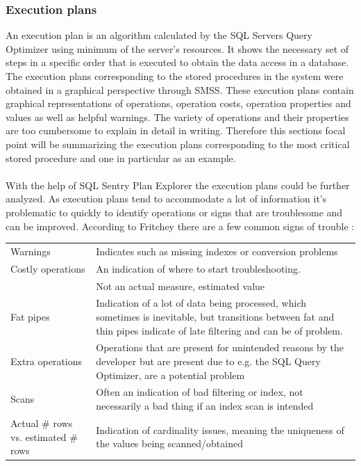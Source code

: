 \documentclass{cslthse-msc}
\begin{document}
\subsubsection{Execution plans}
An execution plan is an algorithm calculated by the SQL Servers Query Optimizer using minimum of the server's resources. It shows the necessary set of steps in a specific order that is executed to obtain the data access in a database. The execution plans corresponding to the stored procedures in the system were obtained in a graphical perspective through SMSS. These execution plans contain graphical representations of operations, operation costs, operation properties and values as well as helpful warnings. The variety of operations and their properties are too cumbersome to explain in detail in writing. Therefore this sections focal point will be summarizing the execution plans corresponding to the most critical stored procedure and one in particular as an example.\\\\      
With the help of SQL Sentry Plan Explorer the execution plans could be further analyzed. As execution plans tend to accommodate a lot of information it's problematic to quickly to identify operations or signs that are troublesome and can be improved. According to Fritchey there are a few common signs of trouble \cite{fritchey2}:
\begin{table}[H]
\begin{center}
\begin{tabular}{p{3cm} p{10cm}}
Warnings & Indicates such as missing indexes or conversion problems\\
Costly operations & An indication of where to start troubleshooting.\\ & Not an actual measure, estimated value\\
Fat pipes & Indication of a lot of data being processed, which sometimes is inevitable, but transitions between fat and thin pipes indicate of late filtering and can be of problem.\\
Extra operations & Operations that are present for unintended reasons by the developer but are present due to e.g. the SQL Query Optimizer, are a potential problem\\
Scans & Often an indication of bad filtering or index, not necessarily a bad thing if an index scan is intended\\
Actual \# rows vs. estimated \# rows & Indication of cardinality issues, meaning the uniqueness of the values being scanned/obtained \\
\end{tabular}
\end{center}
\end{table}
 
\end{document}
